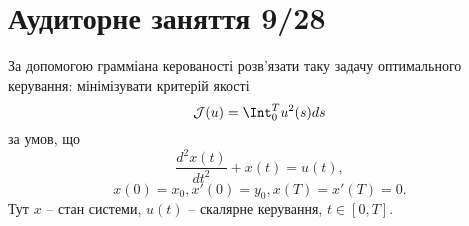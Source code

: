 \setcounter{section}{3}

\section{Аудиторне заняття 9/28}

\setcounter{section}{3}
\setcounter{problem}{3}

\begin{problem}
    За допомогою грамміана керованості розв'язати таку задачу оптимального керування: мінімізувати критерій якості 
    \[ \mathcal{J}(u) = \Int_0^T u^2(s) ds \]
    за умов, що
    \[ \dfrac{d^2x(t)}{dt^2} + x(t) = u(t), \]
    \[ x(0) = x_0, x'(0) = y_0, x(T) = x'(T) = 0. \]
    Тут $x$ -- стан системи, $u(t)$ -- скалярне керування, $t \in [0, T]$.
\end{problem}

